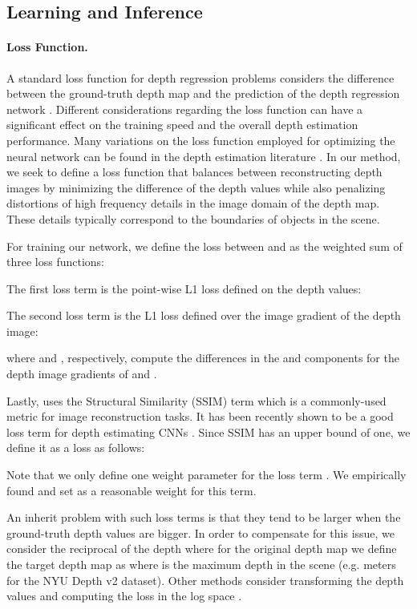 \documentclass[10pt,twocolumn,letterpaper]{article}
\begin{document}
\subsection{Learning and Inference}


\paragraph{Loss Function.} A standard loss function for depth regression problems considers the difference between the ground-truth depth map  and the prediction of the depth regression network  \cite{Eigen2014}. Different considerations regarding the loss function can have a significant effect on the training speed and the overall depth estimation performance. Many variations on the loss function employed for optimizing the neural network can be found in the depth estimation literature \cite{Eigen2014,Laina2016,Ummenhofer2017,Fu2018DeepOR}. In our method, we seek to define a loss function that balances between reconstructing depth images by minimizing the difference of the depth values while also penalizing distortions of high frequency details in the image domain of the depth map. These details typically correspond to the boundaries of objects in the scene.

For training our network, we define the loss  between  and  as the weighted sum of three loss functions: 


The first loss term  is the point-wise L1 loss defined on the depth values:


The second loss term  is the L1 loss defined over the image gradient  of the depth image:

where  and , respectively, compute the differences in the  and  components for the depth image gradients of  and . 

Lastly,  uses the Structural Similarity (SSIM) \cite{Wang2004SSIM} term which is a commonly-used metric for image reconstruction tasks. It has been recently shown to be a good loss term for depth estimating CNNs \cite{Godard2017}. Since SSIM has an upper bound of one, we define it as a loss  as follows:

Note that we only define one weight parameter  for the loss term . We empirically found and set  as a reasonable weight for this term. 

An inherit problem with such loss terms is that they tend to be larger when the ground-truth depth values are bigger. In order to compensate for this issue, we consider the reciprocal of the depth \cite{Ummenhofer2017, Huang2018DeepMVSLM} where for the original depth map  we define the target depth map  as  where  is the maximum depth in the scene (e.g.  meters for the NYU Depth v2 dataset). Other methods consider transforming the depth values and computing the loss in the log space \cite{Eigen2014,Ummenhofer2017}.
\end{document}
